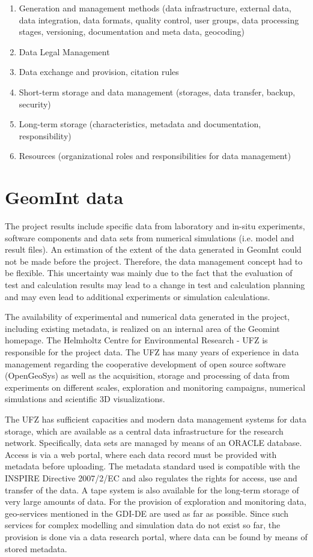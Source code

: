 \begin{enumerate}{\leftmargin=1em \itemindent=0em \itemsep=0.1em}
\item Generation and management methods (data infrastructure, external data, data integration, data formats, quality control, user groups, data processing stages, versioning, documentation and meta data, geocoding)
\item Data Legal Management
\item Data exchange and provision, citation rules
\item Short-term storage and data management (storages, data transfer, backup, security)
\item Long-term storage (characteristics, metadata and documentation, responsibility)
\item Resources (organizational roles and responsibilities for data management)
\end{enumerate}

\section{GeomInt data}

The project results include specific data from laboratory and in-situ experiments, software components and data sets from numerical simulations (i.e. model and result files). An estimation of the extent of the data generated in GeomInt could not be made before the project. Therefore, the data management concept had to be flexible. This uncertainty was mainly due to the fact that the evaluation of test and calculation results may lead to a change in test and calculation planning and may even lead to additional experiments or simulation calculations. 

The availability of experimental and numerical data generated in the project, including existing metadata, is realized on an internal area of the Geomint homepage. The Helmholtz Centre for Environmental Research - UFZ is responsible for the project data. The UFZ has many years of experience in data management regarding the cooperative development of open source software (OpenGeoSys) as well as the acquisition, storage and processing of data from experiments on different scales, exploration and monitoring campaigns, numerical simulations and scientific 3D visualizations. 

The UFZ has sufficient capacities and modern data management systems for data storage, which are available as a central data infrastructure for the research network. Specifically, data sets are managed by means of an ORACLE database. Access is via a web portal, where each data record must be provided with metadata before uploading. The metadata standard used is compatible with the INSPIRE Directive 2007/2/EC and also regulates the rights for access, use and transfer of the data. A tape system is also available for the long-term storage of very large amounts of data. For the provision of exploration and monitoring data, geo-services mentioned in the GDI-DE are used as far as possible. Since such services for complex modelling and simulation data do not exist so far, the provision is done via a data research portal, where data can be found by means of stored metadata.


